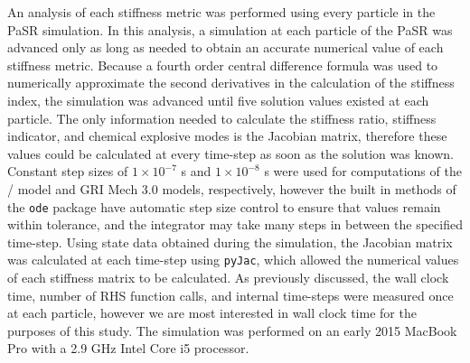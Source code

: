 \documentclass[12pt]{ussci}
\begin{document}
An analysis of each stiffness metric was performed using every particle in the PaSR simulation.
In this analysis, a simulation at each particle of the PaSR was advanced only as long as needed to obtain an accurate numerical value of each stiffness metric.
Because a fourth order central difference formula was used to numerically approximate the second derivatives in the calculation of the stiffness index, the simulation was advanced until five solution values existed at each particle.
The only information needed to calculate the stiffness ratio, stiffness indicator, and chemical explosive modes is the Jacobian matrix, therefore these values could be calculated at every time-step as soon as the solution was known.
Constant step sizes of $1 \times 10^{-7}$ s and $1 \times 10^{-8}$ s were used for computations of the \slash {} model and GRI Mech 3.0 models, respectively, however the built in methods of the \texttt{ode} package have automatic step size control to ensure that values remain within tolerance, and the integrator may take many steps in between the specified time-step.
Using state data obtained during the simulation, the Jacobian matrix was calculated at each time-step using \texttt{pyJac}, which allowed the numerical values of each stiffness matrix to be calculated.
As previously discussed, the wall clock time, number of RHS function calls, and internal time-steps were measured once at each particle, however we are most interested in wall clock time for the purposes of this study.
The simulation was performed on an early 2015 MacBook Pro with a 2.9 GHz Intel Core i5 processor.
\end{document}
